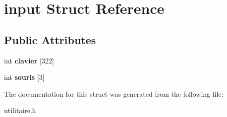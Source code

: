 \hypertarget{structinput}{}\section{input Struct Reference}
\label{structinput}
\subsection*{Public Attributes}
\begin{DoxyCompactItemize}
\item 
int {\bfseries clavier} \mbox{[}322\mbox{]}\hypertarget{structinput_a16310d492ad445ab28f8967aa370cbdc}{}\label{structinput_a16310d492ad445ab28f8967aa370cbdc}

\item 
int {\bfseries souris} \mbox{[}3\mbox{]}\hypertarget{structinput_a8c22f8ed0c0b5b39742ed43aaffad224}{}\label{structinput_a8c22f8ed0c0b5b39742ed43aaffad224}

\end{DoxyCompactItemize}


The documentation for this struct was generated from the following file\+:\begin{DoxyCompactItemize}
\item 
utilitaire.\+h\end{DoxyCompactItemize}
